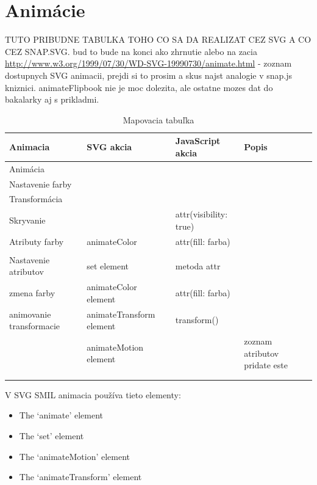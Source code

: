 

\section{Animácie }

TUTO PRIBUDNE TABULKA TOHO CO SA DA REALIZAT CEZ SVG A CO CEZ SNAP.SVG.
bud to bude na konci ako zhrnutie alebo na zacia
\url{http://www.w3.org/1999/07/30/WD-SVG-19990730/animate.html} - zoznam dostupnych SVG animacii, prejdi si to prosim a skus najst analogie v snap.js kniznici. animateFlipbook nie je moc dolezita, ale ostatne mozes dat do bakalarky aj s prikladmi.
\begin{table}[H]
	
	\begin{center}
		\begin{tabular}{|p{3cm}|p{3cm}|p{3cm}|p{3cm}|}
			\hline \textbf{Animacia} & \textbf{SVG akcia} & \textbf{JavaScript akcia} & \textbf{Popis} \\ 
			\hline Animácia &  &  &  \\ 
			\hline Nastavenie farby &  &  &  \\ 
			\hline Transformácia &  &  &  \\ 
			\hline Skryvanie  &  & attr({visibility: true}) &  \\ 
			\hline Atributy farby & animateColor  & attr({fill: farba}) &  \\ 
			\hline  &  &  &  \\ 
				\hline Nastavenie atributov & set element & metoda attr &  \\ 
				\hline zmena farby & animateColor element & attr(fill: farba) &  \\ 
				\hline animovanie transformacie & animateTransform element & transform() &  \\ 
				\hline  & animateMotion element &  &  zoznam atributov pridate este\\ 
				\hline  &  &  &  \\ 
				\hline  &  &  &  \\ 
				\hline 
		
			\hline 
		\end{tabular} 
	\end{center}
	
	\caption{Mapovacia tabuľka}
	\label{haha2}
\end{table}

 V SVG SMIL animacia používa tieto elementy:
 \begin{itemize}
 	 \item The ‘animate’ element
 \item The ‘set’ element
 \item  The ‘animateMotion’ element
  \item The ‘animateTransform’ element
\end{itemize}



